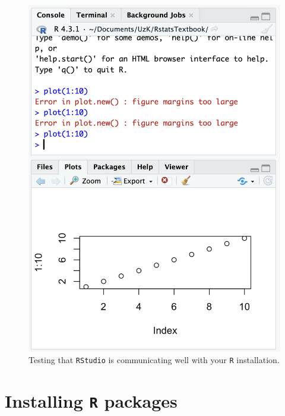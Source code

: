 \documentclass[
  letterpaper,
  DIV=11,
  numbers=noendperiod,
  oneside]{scrreprt}
\begin{document}
\begin{figure}
\begin{minipage}{0.50\linewidth}
{\includegraphics{images/TestplotRStudio.png}

}


\end{minipage}%

\caption{\label{fig-testingRStudio}Testing that \texttt{RStudio} is
communicating well with your \texttt{R} installation.}

\end{figure}%

\section{\texorpdfstring{Installing \texttt{R}
packages}{Installing R packages}}\label{installing-r-packages}
\end{document}
